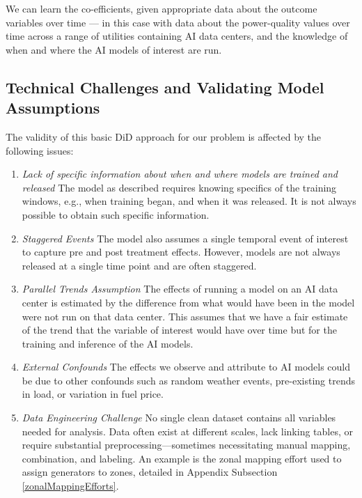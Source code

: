\documentclass[sigconf]{acmart}
\newcommand{\nb}[1]{\textcolor{blue}{NB[#1]}}
\begin{document}
We can learn the co-efficients, given appropriate data about the outcome variables over time --- in this case with data about the power-quality values over time across a range of utilities containing AI data centers, and the knowledge of when and where the AI models of interest are run.



\subsection{Technical Challenges and Validating Model Assumptions}\label{DCASSUmptions}
The validity of this basic DiD approach for our problem is affected by the following issues:
\begin{enumerate}
    \item \textit{Lack of specific information about when and where models are trained and released} The model as described requires knowing specifics of the training windows, e.g., when training began, and when it was released. It is not always possible to obtain such specific information. 
    \item \textit{Staggered Events} The model also assumes a single temporal event of interest to capture pre and post treatment effects. However, models are not always released at a single time point and are often staggered.    
    \item \textit{Parallel Trends Assumption} The effects of running a model on an AI data center is estimated by the difference from what would have been in the model were not run on that data center. This assumes that we have a fair estimate of the trend that the variable of interest would have over time but for the training and inference of the AI models. 
   
    \item \textit{External Confounds} The effects we observe and attribute to AI models could be due to other confounds such as random weather events, pre-existing trends in load, or variation in fuel price.
    \item \textit{Data Engineering Challenge} No single clean dataset contains all variables needed for analysis. Data often exist at different scales, lack linking tables, or require substantial preprocessing—sometimes necessitating manual mapping, combination, and labeling. An example is the zonal mapping effort used to assign generators to zones, detailed in Appendix Subsection \ref{zonalMappingEfforts}.
\end{enumerate}
    
\end{document}
